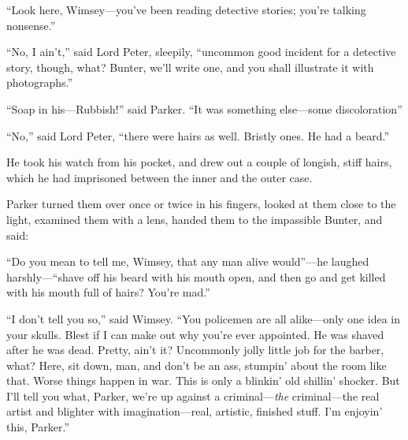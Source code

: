 \enquote{Look here, Wimsey\allowbreak---\allowbreak you’ve been reading detective stories; you’re talking nonsense.}

\enquote{No, I ain’t,} said Lord Peter, sleepily, \enquote{uncommon good incident for a detective story, though, what? Bunter, we’ll write one, and you shall illustrate it with photographs.}

\enquote{Soap in his\allowbreak---\allowbreak Rubbish!} said Parker. \enquote{It was something else\allowbreak---\allowbreak some discoloration\longdash}

\enquote{No,} said Lord Peter, \enquote{there were hairs as well. Bristly ones. He had a beard.}

He took his watch from his pocket, and drew out a couple of longish, stiff hairs, which he had imprisoned between the inner and the outer case.

Parker turned them over once or twice in his fingers, looked at them close to the light, examined them with a lens, handed them to the impassible Bunter, and said:

\enquote{Do you mean to tell me, Wimsey, that any man alive would}---he laughed harshly---\enquote{shave off his beard with his mouth open, and then go and get killed with his mouth full of hairs? You’re mad.}

\enquote{I don’t tell you so,} said Wimsey. \enquote{You policemen are all alike\allowbreak---\allowbreak only one idea in your skulls. Blest if I can make out why you’re ever appointed. He was shaved after he was dead. Pretty, ain’t it? Uncommonly jolly little job for the barber, what? Here, sit down, man, and don’t be an ass, stumpin’ about the room like that. Worse things happen in war. This is only a blinkin’ old shillin’ shocker. But I’ll tell you what, Parker, we’re up against a criminal---\textit{the} criminal\allowbreak---\allowbreak the real artist and blighter with imagination\allowbreak---\allowbreak real, artistic, finished stuff. I’m enjoyin’ this, Parker.}